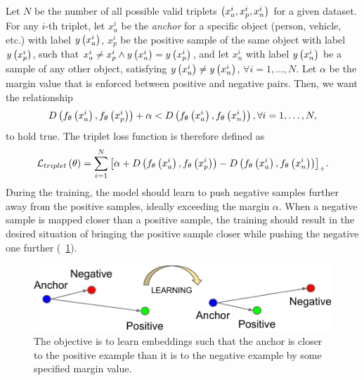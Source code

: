 Let $N$ be the number of all possible valid triplets $\left( {x_a^i, x_p^i, x_n^i} \right)$ for a given dataset. For any $i$-th triplet, let $x_a^i$ be the \emph{anchor} for a specific object (person, vehicle, etc.) with label ${y} \left( x_a^i \right)$, $x_p^i$ be the positive sample of the same object with label ${y} \left( x_p^i \right)$, such that $x_a^i \neq x_p^i \land {y} \left( x_a^i \right) = {y} \left( x_p^i \right)$, and let $x_n^i$ with label ${y} \left( x_n^i \right)$ be a sample of any other object, satisfying ${y} \left( x_a^i \right) \neq {y} \left( x_n^i \right)$, $\forall i = 1, \dots, N$. Let $\alpha$ be the margin value that is enforced between positive and negative pairs. Then, we want the relationship
\begin{equation}
    \label{eq:TripletDistanceConstraint}
    {D} \left( {f_\theta} \left( x_a^i \right), {f_\theta} \left( x_p^i \right) \right) + \alpha < {D} \left( {f_\theta} \left( x_a^i \right), {f_\theta} \left( x_n^i \right) \right), \forall i = 1, \dots, N,
\end{equation}
to hold true. The triplet loss function is therefore defined as
\begin{equation}
    \label{eq:TripletLoss}
    {\mathcal{L}_{triplet}} \left( \theta \right) =
    \sum_{i = 1}^{N}
    {\left[ {
        \alpha +
        {D} \left( {f_\theta} \left( x_a^i \right), {f_\theta} \left( x_p^i \right) \right) -
        {D} \left( {f_\theta} \left( x_a^i \right), {f_\theta} \left( x_n^i \right) \right)
    } \right]}_+.
\end{equation}
During the training, the model should learn to push negative samples further away from the positive samples, ideally exceeding the margin $\alpha$. When a negative sample is mapped closer than a positive sample, the training should result in the desired situation of bringing the positive sample closer while pushing the negative one further (\figtext{}~\ref{fig:TripletLossLearningProcess}).

\begin{figure}[t]
    \centerline{\includegraphics[width=0.6\linewidth]{figures/theoretical_foundations/triplet_loss_learning_process.pdf}}
    \caption[Triplet loss learning]{The objective is to learn embeddings such that the anchor is closer to the positive example than it is to the negative example by some specified margin value. }
    \label{fig:TripletLossLearningProcess}
\end{figure}

